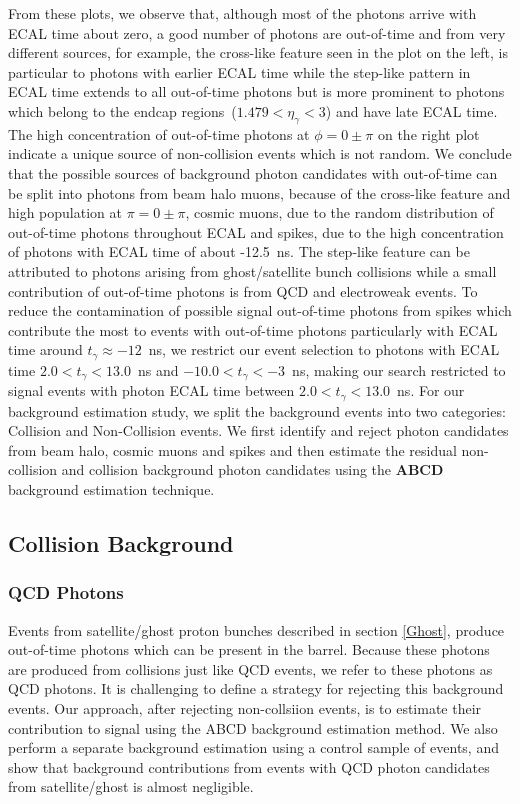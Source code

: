 \vspace{5mm}
From these plots, we observe that, although most of the photons arrive with ECAL time about zero, a good number of photons are out-of-time and from very different sources, for example, the cross-like feature seen in the plot on the left, is particular to photons with earlier ECAL time while the step-like pattern in ECAL time extends to all out-of-time photons but is more prominent to photons which belong to the endcap regions~($1.479 < \eta_{\gamma} < 3$) and have late ECAL time. The high concentration of out-of-time photons at $\phi=0\pm\pi$ on the right plot indicate a unique source of non-collision events which is not random. We conclude that the possible sources of background photon candidates with out-of-time can be split into photons from beam halo muons, because of the cross-like feature and high population at $\pi=0\pm\pi$, cosmic muons, due to the random distribution of out-of-time photons throughout ECAL and spikes, due to the high concentration of photons with ECAL time of about -12.5~ns. The step-like feature can be attributed to photons arising from ghost/satellite bunch collisions while a small contribution of out-of-time photons is from QCD  and electroweak events. To reduce the contamination of possible signal out-of-time photons from spikes which contribute the most to events with out-of-time photons particularly with ECAL time around $t_{\gamma} \approx -12$~ns, we restrict our event selection to photons with ECAL time $ 2.0 < t_{\gamma} < 13.0$~ns and $-10.0 < t_{\gamma} < -3$~ns, making our search restricted to signal events with photon ECAL time between $2.0 < t_{\gamma} < 13.0$~ns.
\newline
For our background estimation study, we split the background events into two categories: Collision and Non-Collision events. We first identify and reject photon candidates from beam halo, cosmic muons and spikes and then estimate the residual non-collision and collision background photon candidates  using the \textbf{\textsf{ABCD}} background estimation technique. 

\subsection{Collision Background}
\subsubsection{QCD Photons}
Events from satellite/ghost proton bunches described in section \ref{Ghost}, produce out-of-time photons which can be present in the barrel. Because these photons are produced from collisions just like QCD events, we refer to these photons as QCD photons. It is challenging to define a strategy for rejecting this background events. Our approach, after rejecting non-collsiion events, is to estimate their contribution to signal using the \textsf{ABCD} background estimation method. We also perform a separate background estimation using a control sample of \PZ events, and show that background contributions from events with QCD photon candidates from satellite/ghost is almost negligible.%
